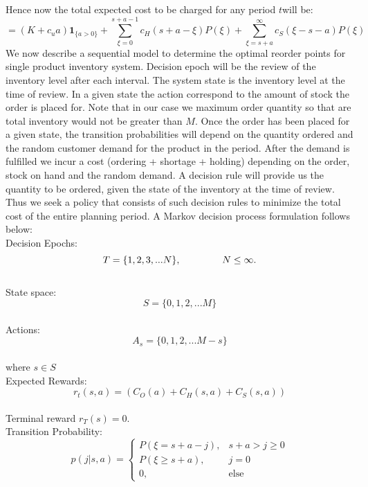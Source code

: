 \documentclass[11pt,a4paper,oneside]{report}
\begin{document}
Hence now the total expected cost to be charged for any period $t$will be:
\begin{equation}
= (K+ c_u {a})\mathbf{1}_{\lbrace a>0\rbrace} + \sum_{\xi=0}^{s+a-1}c_H(s+a-\xi)P(\xi) + \sum_{\xi=s+a}^{\infty}c_S(\xi-s-a)P(\xi)
\end{equation} 
We now describe a sequential model to determine the optimal reorder points for single product inventory system. Decision epoch will be the review of the inventory level after each interval. The system state is the inventory level at the time of review. In a given state the action correspond to the amount of stock the order is placed for. Note that in our case we maximum order quantity so that are total inventory would not be greater than $M$. Once the order has been placed for a given state, the transition probabilities will depend on the quantity ordered and the random customer demand for the product in the period. After the demand is fulfilled we incur a cost (ordering + shortage + holding) depending on the order, stock on hand and the random demand. A decision rule will provide us the quantity to be ordered, given the state of the inventory at the time of review. Thus we seek a policy that consists of such decision rules to minimize the total cost of the entire planning period. 
A Markov decision process formulation follows below:\\

\noindent Decision Epochs:\\
\begin{equation*}T = \lbrace 1,2,3,...N \rbrace,\hspace{1.5cm}   N \leq \infty. 
\end{equation*}\\
\noindent State space:\\
\begin{equation*}S = \lbrace 0,1,2,...M \rbrace  
\end{equation*}\\
\noindent Actions:\\
\begin{equation*}A_s  = \lbrace0,1,2,...M-s \rbrace
\end{equation*}\\
where $s\in S$\\
\noindent Expected Rewards:\\
\begin{equation*}r_t(s,a) = (C_O(a) + C_H(s,a) + C_S(s,a)) 
\end{equation*}\\
\noindent Terminal reward $r_T(s)=0$.
\noindent \\Transition Probability:\\
\begin{equation*}
p(j|s,a)=
\begin{cases}
P(\xi= s+a-j),&{s+a}>j\geq0\\
P(\xi\geq s+a),&j=0\\
0,&\text{else}
\end{cases}
\end{equation*}
\end{document}
